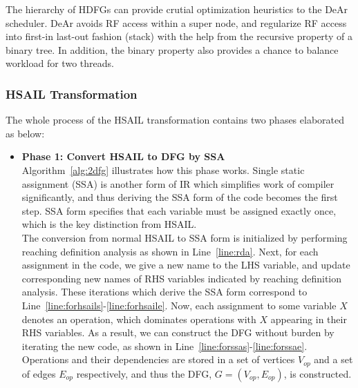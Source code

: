 \documentclass[12pt]{article}
\newcounter{phase}[algorithm]
\begin{document}
\begin{CJK}{UTF8}{bkai}
            The hierarchy of HDFGs can provide crutial optimization heuristics to the DeAr scheduler.
            DeAr avoids RF access within a super node, and regularize RF access into first-in last-out fashion (stack) with the help from the recursive property of a binary tree.
            In addition, the binary property also provides a chance to balance workload for two threads.



        
        \subsubsection{HSAIL Transformation}
        \label{sec:trans}
        The whole process of the HSAIL transformation contains two phases elaborated as below:
        \begin{itemize}
            \item \textbf{Phase 1: Convert HSAIL to DFG by SSA} \\\indent
                Algorithm~\ref{alg:2dfg} illustrates how this phase works.
                Single static assignment (SSA) \cite{ssa} is another form of IR which simplifies work of compiler significantly, 
                and thus deriving the SSA form of the code becomes the first step.
                SSA form specifies that each variable must be assigned exactly once, which is the key distinction from HSAIL.
                \\\indent
                The conversion from normal HSAIL to SSA form is initialized by performing reaching definition analysis \cite{rda} as shown in Line~\ref{line:rda}.
                Next, for each assignment in the code, we give a new name to the LHS variable, and update corresponding new names of RHS variables indicated by reaching definition analysis.
                These iterations which derive the SSA form correspond to Line~\ref{line:forhsails}-\ref{line:forhsaile}.
                Now, each assignment to some variable $X$ denotes an operation, which dominates operations with $X$ appearing in their RHS variables.
                As a result, we can construct the DFG without burden by iterating the new code, as shown in Line~\ref{line:forssas}-\ref{line:forssae}.
                Operations and their dependencies are stored in a set of vertices $V_{op}$ and a set of edges $E_{op}$ respectively, 
                and thus the DFG, $G = ( V_{op} , E_{op} )$, is constructed.
        \begin{algorithm}[h!]    \caption{}

\end{algorithm}
\end{itemize}
\end{CJK}
\end{document}
